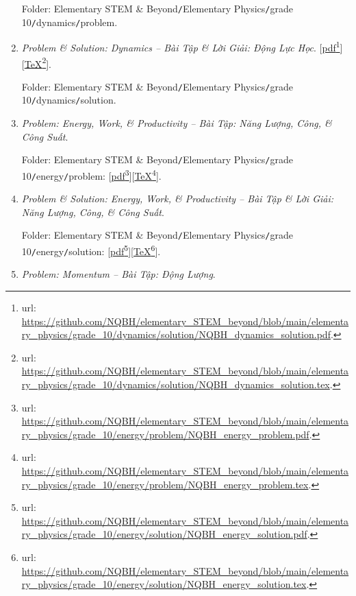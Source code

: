 \documentclass[12pt,oneside]{book}
\begin{document}
\begin{enumerate}
	Folder: {\sf Elementary STEM \& Beyond{\tt/}Elementary Physics{\tt/}grade 10{\tt/}dynamics{\tt/}problem}.
	
	\item {\it Problem \& Solution: Dynamics -- Bài Tập \& Lời Giải: Động Lực Học}. [\href{https://github.com/NQBH/elementary_STEM_beyond/blob/main/elementary_physics/grade_10/dynamics/solution/NQBH_dynamics_solution.pdf}{pdf}\footnote{{\sc url}: \url{https://github.com/NQBH/elementary_STEM_beyond/blob/main/elementary_physics/grade_10/dynamics/solution/NQBH_dynamics_solution.pdf}.}][\href{https://github.com/NQBH/elementary_STEM_beyond/blob/main/elementary_physics/grade_10/dynamics/solution/NQBH_dynamics_solution.tex}{\TeX}\footnote{{\sc url}: \url{https://github.com/NQBH/elementary_STEM_beyond/blob/main/elementary_physics/grade_10/dynamics/solution/NQBH_dynamics_solution.tex}.}].
	
	Folder: {\sf Elementary STEM \& Beyond{\tt/}Elementary Physics{\tt/}grade 10{\tt/}dynamics{\tt/}solution}.
	\item {\it Problem: Energy, Work, \it\& Productivity -- Bài Tập: Năng Lượng, Công, {\it\&} Công Suất}.
	
	Folder: {\sf Elementary STEM \& Beyond{\tt/}Elementary Physics{\tt/}grade 10{\tt/}energy{\tt/}problem}: [\href{https://github.com/NQBH/elementary_STEM_beyond/blob/main/elementary_physics/grade_10/energy/problem/NQBH_energy_problem.pdf}{pdf}\footnote{{\sc url}: \url{https://github.com/NQBH/elementary_STEM_beyond/blob/main/elementary_physics/grade_10/energy/problem/NQBH_energy_problem.pdf}.}][\href{https://github.com/NQBH/elementary_STEM_beyond/blob/main/elementary_physics/grade_10/energy/problem/NQBH_energy_problem.tex}{\TeX}\footnote{{\sc url}: \url{https://github.com/NQBH/elementary_STEM_beyond/blob/main/elementary_physics/grade_10/energy/problem/NQBH_energy_problem.tex}.}].
	
	\item {\it Problem \& Solution: Energy, Work, \it\& Productivity -- Bài Tập \& Lời Giải: Năng Lượng, Công, {\it\&} Công Suất}.
	
	Folder: {\sf Elementary STEM \& Beyond{\tt/}Elementary Physics{\tt/}grade 10{\tt/}energy{\tt/}solution}: [\href{https://github.com/NQBH/elementary_STEM_beyond/blob/main/elementary_physics/grade_10/energy/solution/NQBH_energy_solution.pdf}{pdf}\footnote{{\sc url}: \url{https://github.com/NQBH/elementary_STEM_beyond/blob/main/elementary_physics/grade_10/energy/solution/NQBH_energy_solution.pdf}.}][\href{https://github.com/NQBH/elementary_STEM_beyond/blob/main/eleomentummentary_physics/grade_10/energy/solution/NQBH_energy_solution.tex}{\TeX}\footnote{{\sc url}: \url{https://github.com/NQBH/elementary_STEM_beyond/blob/main/elementary_physics/grade_10/energy/solution/NQBH_energy_solution.tex}.}].
	\item {\it Problem: Momentum -- Bài Tập: Động Lượng}.
	

\end{enumerate}
\end{document}

